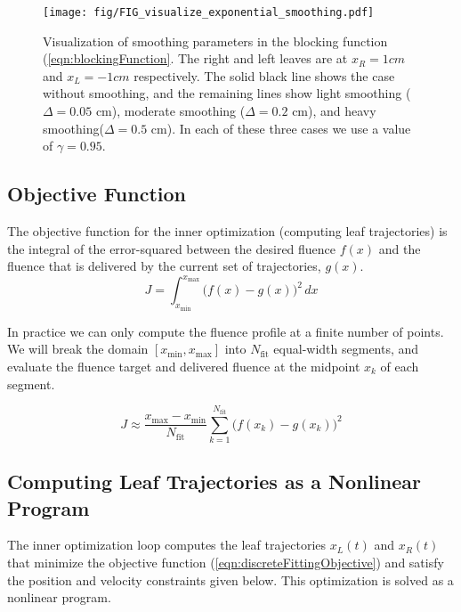 \documentclass[12pt]{article}
\begin{document}
\begin{figure}
  \centering
  \texttt{[image: fig/FIG\_visualize\_exponential\_smoothing.pdf]}
  \caption{Visualization of smoothing parameters in the blocking function (\ref{eqn:blockingFunction}. The right and left leaves are at $x_R = 1 cm$ and $x_L = -1 cm$ respectively. The solid black line shows the case without smoothing, and the remaining lines show light smoothing ($\Delta = 0.05$ cm), moderate smoothing ($\Delta = 0.2$ cm), and heavy smoothing($\Delta = 0.5$ cm). In each of these three cases we use a value of $\gamma = 0.95$.}
  \label{fig:visualizeExponentialSmoothing}
\end{figure}


\subsection{Objective Function}

The objective function for the inner optimization (computing leaf trajectories)
is the integral of the error-squared between the desired fluence $f(x)$ and the fluence that
is delivered by the current set of trajectories, $g(x)$.
\begin{equation}
  J = \int_{x_\text{min}}^{x_\text{max}} \! \bigg( f(x) - g(x) \bigg)^2 \,dx
  \label{eqn:continuousFittingObjective}
\end{equation}

In practice we can only compute the fluence profile at a finite number of points. We will break the domain $[x_\text{min}, x_\text{max}]$ into $N_\text{fit}$ equal-width segments,
and evaluate the fluence target and delivered fluence at the midpoint $x_k$ of each segment.

\begin{equation}
  J \approx \frac{x_\text{max} - x_\text{min}}{N_\text{fit}}
  \sum_{k = 1}^{N_\text{fit}} \! \bigg( f(x_k) - g(x_k) \bigg)^2
  \label{eqn:discreteFittingObjective}
\end{equation}

\subsection{Computing Leaf Trajectories as a Nonlinear Program}
\label{sec:LeafTrajectoryAsNLP}

The inner optimization loop computes the leaf trajectories $x_L(t)$ and $x_R(t)$
that minimize the objective function (\ref{eqn:discreteFittingObjective})
and satisfy the position and velocity constraints given below.
This optimization is solved as a nonlinear program.
\end{document}
